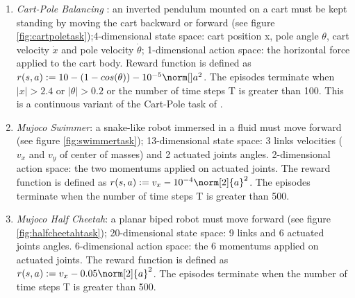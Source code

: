\begin{enumerate}
	\item \emph{Cart-Pole Balancing} : an inverted pendulum mounted on a cart must be kept standing by moving the cart backward or forward (see figure \ref{fig:cartpoletask});4-dimensional state space: cart position x, pole angle $\theta$, cart velocity $\dot{x}$ and pole velocity $\dot{\theta}$; 1-dimensional action space: the horizontal force applied to the cart body. Reward function  is defined as $r(s, a) := 10 - (1 - cos(\theta)) - 10^{-5}\norm[] a^2$. The episodes terminate when $|x|>2.4$ or $|\theta|>0.2$ or the number of time steps T is greater than 100. This is a continuous variant of the Cart-Pole task of \cite{sutton1998reinforcement}.
	\item \emph{Mujoco Swimmer}: a snake-like robot immersed in a fluid must move forward (see figure \ref{fig:swimmertask}); 13-dimensional state space: 3 links velocities ($v_x$ and $v_y$ of center of masses) and 2 actuated joints angles. 2-dimensional action space: the two momentums applied on actuated joints.  The reward function is defined as $r(s, a) := v_x - 10^{-4}\norm[2]{a}^2$. The episodes terminate when the number of time steps T is greater than 500.
	\item \emph{Mujoco Half Cheetah}: a planar biped robot must move forward (see figure \ref{fig:halfcheetahtask}); 20-dimensional state space: 9 links and 6 actuated joints angles. 6-dimensional action space: the 6 momentums applied on actuated joints.  The reward function is defined as $r(s, a) := v_x - 0.05\norm[2]{a}^2$. The episodes terminate when the number of time steps T is greater than 500.
\end{enumerate}
